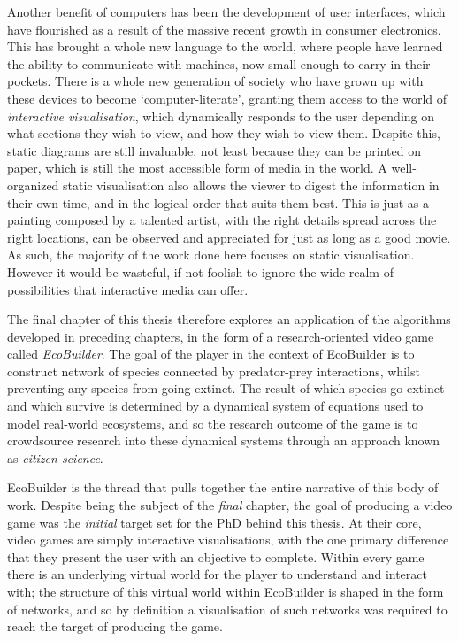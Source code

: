 Another benefit of computers has been the development of user interfaces, which have flourished as a result of the massive recent growth in consumer electronics. This has brought a whole new language to the world, where people have learned the ability to communicate with machines, now small enough to carry in their pockets. There is a whole new generation of society who have grown up with these devices to become `computer-literate', granting them access to the world of \emph{interactive visualisation}, which dynamically responds to the user depending on what sections they wish to view, and how they wish to view them.
Despite this, static diagrams are still invaluable, not least because they can be printed on paper, which is still the most accessible form of media in the world. A well-organized static visualisation also allows the viewer to digest the information in their own time, and in the logical order that suits them best. This is just as a painting composed by a talented artist, with the right details spread across the right locations, can be observed and appreciated for just as long as a good movie.
As such, the majority of the work done here focuses on static visualisation. However it would be wasteful, if not foolish to ignore the wide realm of possibilities that interactive media can offer.

The final chapter of this thesis therefore explores an application of the algorithms developed in preceding chapters, in the form of a research-oriented video game called \emph{EcoBuilder}. The goal of the player in the context of EcoBuilder is to construct network of species connected by predator-prey interactions, whilst preventing any species from going extinct. The result of which species go extinct and which survive is determined by a dynamical system of equations used to model real-world ecosystems, and so the research outcome of the game is to crowdsource research into these dynamical systems through an approach known as \emph{citizen science}.

EcoBuilder is the thread that pulls together the entire narrative of this body of work. Despite being the subject of the \emph{final} chapter, the goal of producing a video game was the \emph{initial} target set for the PhD behind this thesis.
At their core, video games are simply interactive visualisations, with the one primary difference that they present the user with an objective to complete. Within every game there is an underlying virtual world for the player to understand and interact with; the structure of this virtual world within EcoBuilder is shaped in the form of networks, and so by definition a visualisation of such networks was required to reach the target of producing the game.

